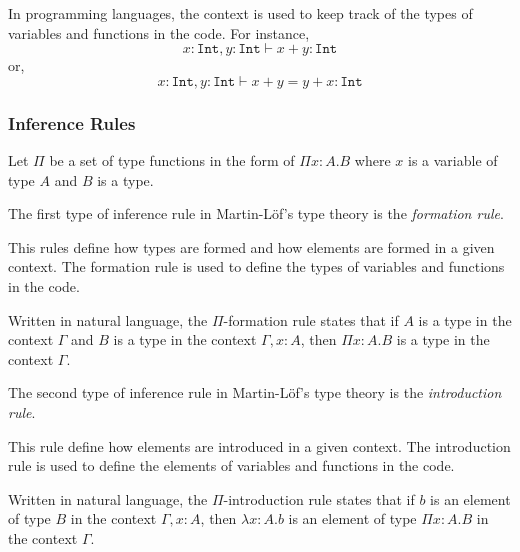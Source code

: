In programming languages, the context is used to keep track of the types of variables and functions in the code. For instance,
$$
x : \texttt{Int}, y : \texttt{Int} \vdash x + y : \texttt{Int}
$$
or,
$$
x : \texttt{Int}, y : \texttt{Int} \vdash x + y = y + x : \texttt{Int}
$$

\subsubsection{Inference Rules}\label{subsubsec:InferenceRules}
Let $\Pi$ be a set of type functions in the form of $\Pi x : A. B$ where $x$ is a variable of type $A$ and $B$ is a type.

The first type of inference rule in Martin-L\"of's type theory is the \textit{formation rule}.
\begin{tcolorbox}[myboxstyle=black, title=Formation Rule]
     This rules define how types are formed and how elements are formed in a given context. The formation rule is used to define the types of variables and functions in the code.
    \begin{prooftree}
    \end{prooftree}
    \tcblower
    Written in natural language, the $\Pi$-formation rule states that if $A$ is a type in the context $\Gamma$ and $B$ is a type in the context $\Gamma, x : A$, then $\Pi x : A. B$ is a type in the context $\Gamma$.
\end{tcolorbox}

The second type of inference rule in Martin-L\"of's type theory is the \textit{introduction rule}.
\begin{tcolorbox}[myboxstyle=black, title=Introduction Rule]
    This rule define how elements are introduced in a given context. The introduction rule is used to define the elements of variables and functions in the code.
    \begin{prooftree}
    \end{prooftree}
    \tcblower
    Written in natural language, the $\Pi$-introduction rule states that if $b$ is an element of type $B$ in the context $\Gamma, x : A$, then $\lambda x : A. b$ is an element of type $\Pi x : A. B$ in the context $\Gamma$.
\end{tcolorbox}


